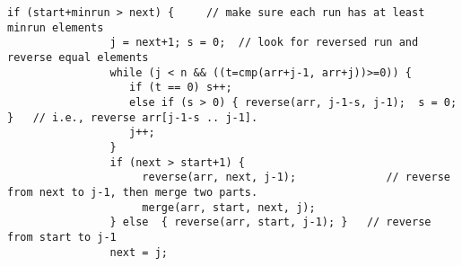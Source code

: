 \documentclass[AMA,STIX1COL]{WileyNJD-v2}
\begin{document}
\begin{lstlisting}[style=CStyle]
           if (start+minrun > next) {     // make sure each run has at least minrun elements                                                                                                        
                j = next+1; s = 0;  // look for reversed run and reverse equal elements                                                                                                                                                              
                while (j < n && ((t=cmp(arr+j-1, arr+j))>=0)) {                                                                                                                       
                   if (t == 0) s++;                                                                                                                                                    
                   else if (s > 0) { reverse(arr, j-1-s, j-1);  s = 0;  }   // i.e., reverse arr[j-1-s .. j-1].                                                                                                                                                       
                   j++;                                                                                                                                                                
                }                                                                                                                                                                      
                if (next > start+1) {
                     reverse(arr, next, j-1);              // reverse from next to j-1, then merge two parts.                                                                                                                                          
                     merge(arr, start, next, j);  
                } else  { reverse(arr, start, j-1); }   // reverse from start to j-1                                                                                                                                                                                                                                                         
                next = j;   


\end{lstlisting}
\end{document}
